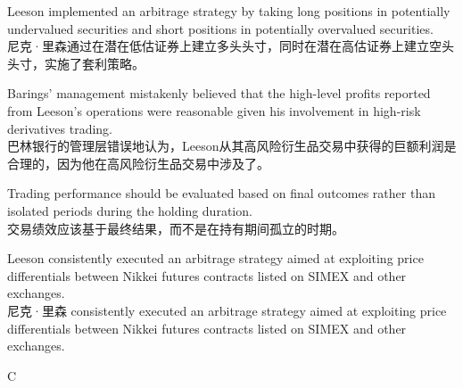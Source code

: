\documentclass{article}
\begin{document}
    \begin{choices}
        \item Leeson implemented an arbitrage strategy by taking long positions in potentially undervalued securities and short positions in potentially overvalued securities. \\
        尼克·里森通过在潜在低估证券上建立多头头寸，同时在潜在高估证券上建立空头头寸，实施了套利策略。

        \item Barings' management mistakenly believed that the high-level profits reported from Leeson's operations were reasonable given his involvement in high-risk derivatives trading. \\
        巴林银行的管理层错误地认为，Leeson从其高风险衍生品交易中获得的巨额利润是合理的，因为他在高风险衍生品交易中涉及了。
        
        \item Trading performance should be evaluated based on final outcomes rather than isolated periods during the holding duration. \\
        交易绩效应该基于最终结果，而不是在持有期间孤立的时期。
        
        \item Leeson consistently executed an arbitrage strategy aimed at exploiting price differentials between Nikkei futures contracts listed on SIMEX and other exchanges. \\
        尼克·里森 consistently executed an arbitrage strategy aimed at exploiting price differentials between Nikkei futures contracts listed on SIMEX and other exchanges.
    \end{choices}


\begin{correctanswer}
   C
\end{correctanswer}
\end{document}
